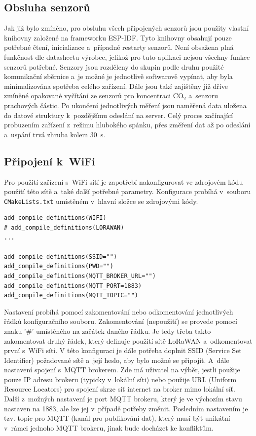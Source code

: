 \subsection{Obsluha senzorů}

Jak již bylo zmíněno, pro obsluhu všech připojených senzorů jsou použity vlastní knihovny založené na frameworku ESP-IDF. Tyto knihovny obsahují pouze potřebné čtení, inicializace a~případné restarty senzorů. Není obsažena plná funkčnost dle datasheetu výrobce, jelikož pro tuto aplikaci nejsou všechny funkce senzorů potřebné. Senzory jsou rozděleny do skupin podle druhu použité komunikační sběrnice a~je možné je jednotlivě softwarově vypínat, aby byla minimalizována spotřeba celého zařízení. Dále jsou také zajištěny již dříve zmíněné opakované vyčítání ze senzorů pro koncentraci CO$_2$ a~senzoru prachových částic. Po ukončení jednotlivých měření jsou naměřená data uložena do datové struktury k~pozdějšímu odeslání na server. Celý proces začínající probuzením zařízení z~režimu hlubokého spánku, přes změření dat až po odeslání a~uspání trvá zhruba kolem \SI{30}{\second}.

\subsection{Připojení k~WiFi}

Pro použití zařízení s~WiFi sítí je zapotřebí nakonfigurovat ve zdrojovém kódu použití této sítě a~také další potřebné parametry. Konfigurace probíhá v~souboru \texttt{CMakeLists.txt} umístěném v~hlavní složce se zdrojovými kódy.

\begin{lstlisting}[caption={Nastavení spojení pomocí WiFi}]
add_compile_definitions(WIFI)
# add_compile_definitions(LORAWAN)
...

add_compile_definitions(SSID="")
add_compile_definitions(PWD="")
add_compile_definitions(MQTT_BROKER_URL="")
add_compile_definitions(MQTT_PORT=1883)
add_compile_definitions(MQTT_TOPIC="")
\end{lstlisting}

Nastavení probíhá pomocí zakomentování nebo odkomentování jednotlivých řádků konfiguračního souboru. Zakomentování (nepoužití) se provede pomocí znaku '\#' umístěného na začátek daného řádku. Je tedy třeba takto zakomentovat druhý řádek, který definuje použití sítě LoRaWAN a~odkomentovat první s~WiFi sítí.
V této konfiguraci je dále potřeba doplnit SSID (Service Set Identifier) požadované sítě a~její heslo, aby bylo možné se připojit. A~dále nastavení spojení s~MQTT brokerem. Zde má uživatel na výběr, jestli použije pouze IP adresu brokeru (typicky v~lokální síti) nebo použije URL (Uniform Resource Locators) pro spojení skrze síť internet na broker mimo lokální síť. Další z~možných nastavení je port MQTT brokeru, který je ve výchozím stavu nastaven na \SI{1883}{}, ale lze jej v~případě potřeby změnit. Posledním nastavením je tzv. topic pro MQTT (kanál pro publikování dat), který musí být unikátní v~rámci jednoho MQTT brokeru, jinak bude docházet ke konfliktům.

